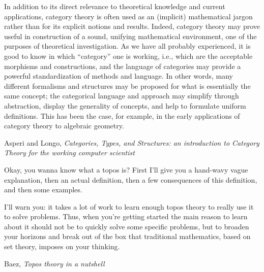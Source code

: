 \documentclass[11pt,openany]{article}
\begin{document}
\pagebreak

\epigraph{In addition to its direct relevance to theoretical knowledge and current applications, category theory
is often used as an (implicit) mathematical jargon rather than for its explicit notions and results.
Indeed, category theory may prove useful in construction of a sound, unifying mathematical
environment, one of the purposes of theoretical investigation. As we have all probably experienced, it
is good to know in which “category” one is working, i.e., which are the acceptable morphisms and
constructions, and the language of categories may provide a powerful standardization of methods and
language. In other words, many different formalisms and structures may be proposed for what is
essentially the same concept; the categorical language and approach may simplify through abstraction,
display the generality of concepts, and help to formulate uniform definitions. This has been the case,
for example, in the early applications of category theory to algebraic geometry.}
{Asperi and Longo, \textit{Categories, Types, and Structures: 
an introduction to Category Theory for the working computer scientist}~\cite{asperti-longo-1991}}

\epigraph{Okay, you wanna know what a topos is? 
First I'll give you a hand-wavy vague explanation, 
then an actual definition, 
then a few consequences of this definition, 
and then some examples.
\par
I'll warn you: 
it takes a lot of work to learn enough topos theory 
to really use it to solve problems. 
Thus, when you're getting started the main reason to learn 
about it should not be to quickly solve some specific problems, 
but to broaden your horizons and break out of the box 
that traditional mathematics, based on set theory, 
imposes on your thinking.}
{Baez, \textit{Topos theory in a 
nutshell}~\cite{baez-2017-topos-theory-nutshell}}

\pagebreak
\end{document}
